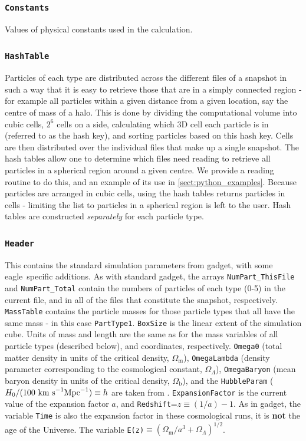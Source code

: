 \documentclass[10pt, a4paper]{article}
\newcommand{\eagle}{{\sc eagle}}
\newcommand{\gadget}{{\sc gadget}}
\begin{document}
\subsubsection{\texttt{Constants}} Values of physical constants used in the
calculation.

\subsubsection{\texttt{HashTable}}
\label{sect:hash_table}
Particles of each type are distributed across the different files of a snapshot
in such a way that it is easy to retrieve those that are in a simply connected
region - for example all particles within a given distance from a given
location, say the centre of mass of a halo.  This is done by dividing the
computational volume into cubic cells, $2^6$ cells on a side, calculating which
3D cell each particle is in (referred to as the hash key), and sorting
particles based on this hash key. Cells are then distributed over the
individual files that make up a single snapshot. The hash tables allow one to
determine which files need reading to retrieve all particles in a spherical
region around a given centre. We provide a reading routine to do this, and an
example of its use in \ref{sect:python_examples}.  Because particles are
arranged in cubic cells, using the hash tables returns particles in cells -
limiting the list to particles in a spherical region is left to the user. Hash
tables are constructed {\em separately} for each particle type.

\subsubsection{\texttt{Header}}
\label{sect:header}
This contains the standard simulation parameters from \gadget, with some
\eagle\ specific additions. As with standard \gadget, the arrays
\texttt{NumPart\_ThisFile} and \texttt{NumPart\_Total} contain the numbers of
particles of each type (0-5) in the current file, and in all of the files that
constitute the snapshot, respectively. \texttt{MassTable} contains the particle
masses for those particle types that all have the same mass - in this case
\texttt{PartType1}. \texttt{BoxSize} is the linear extent of the simulation
cube. Units of mass and length are the same as for the mass variables of all
particle types (described below), and coordinates, respectively.
\texttt{Omega0} (total matter density in units of the critical density,
$\Omega_{\mathrm{m}}$), \texttt{OmegaLambda} (density parameter corresponding
to the cosmological constant, $\Omega_\Lambda$), \texttt{OmegaBaryon} (mean
baryon density in units of the critical density, $\Omega_{\mathrm{b}}$), and
the \texttt{HubbleParam} ($H_0/(100~{\rm km~s}^{-1}{\rm Mpc}^{-1})\equiv h$ are
taken from \cite{Planck13}. \texttt{ExpansionFactor} is the current value of
the expansion factor $a$, and \texttt{Redshift}=$z\equiv (1/a) - 1$. As in
\gadget, the variable \texttt{Time} is also the expansion factor in these
cosmological runs, it is {\bf not} the age of the Universe. The variable
\texttt{E(z)}$\equiv (\Omega_{\mathrm{m}}/a^3+\Omega_\Lambda)^{1/2}$.
\end{document}
